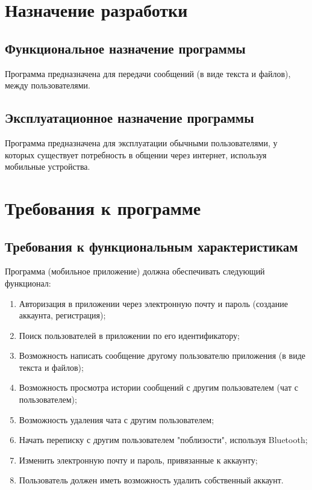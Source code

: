\documentclass[techtask]{espd}
\begin{document}
\section{Назначение разработки}
\subsection{Функциональное назначение программы}
Программа предназначена для передачи сообщений (в виде текста и файлов), между пользователями.

\subsection{Эксплуатационное назначение программы}
Программа предназначена для эксплуатации обычными пользователями, у которых существует потребность в общении через интернет, используя мобильные устройства.

\section{Требования к программе}
\subsection{Требования к функциональным характеристикам}

Программа (мобильное приложение) должна обеспечивать следующий функционал:

\begin{enumerate}
\item Авторизация в приложении через электронную почту и пароль (создание аккаунта, регистрация);
\item Поиск пользователей в приложении по его идентификатору;
\item Возможность написать сообщение другому пользователю приложения (в виде текста и файлов);
\item Возможность просмотра истории сообщений с другим пользователем (чат с пользователем);
\item Возможность удаления чата с другим пользователем;
\item Начать переписку с другим пользователем "поблизости", используя Bluetooth;
\item Изменить электронную почту и пароль, привязанные к аккаунту;
\item Пользователь должен иметь возможность удалить собственный аккаунт.
\end{enumerate}
\end{document}
